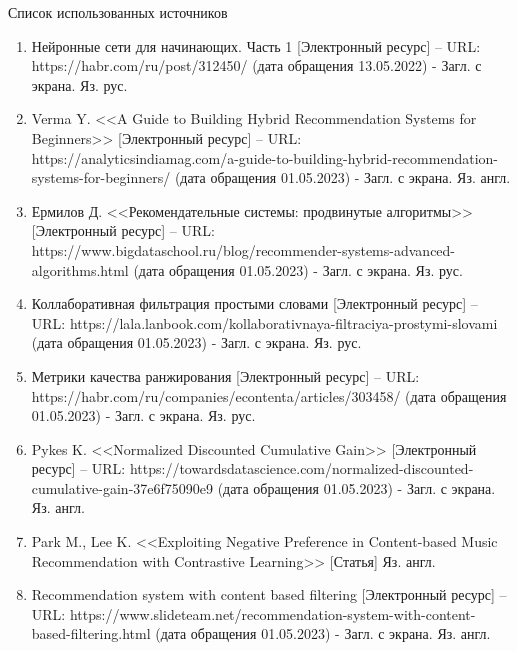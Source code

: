 \documentclass{beamer}
\begin{document}
\begin{frame}{Список использованных источников}
  \begin{enumerate}
    \item Нейронные сети для начинающих. Часть 1 [Электронный ресурс] – URL: https://habr.com/ru/post/312450/ (дата обращения 13.05.2022) - Загл. с экрана. Яз. рус.
    \item Verma Y. <<A Guide to Building Hybrid Recommendation Systems for Beginners>> [Электронный ресурс] – URL: https://analyticsindiamag.com/a-guide-to-building-hybrid-recommendation-systems-for-beginners/ (дата обращения 01.05.2023) - Загл. с экрана. Яз. англ.
    \item Ермилов Д. <<Рекомендательные системы: продвинутые алгоритмы>> [Электронный ресурс] – URL: https://www.bigdataschool.ru/blog/recommender-systems-advanced-algorithms.html (дата обращения 01.05.2023) - Загл. с экрана. Яз. рус.
  \end{enumerate} 
\end{frame}

\begin{frame}
  \begin{enumerate}
    \setcounter{enumi}{3}
    \item Коллаборативная фильтрация простыми словами [Электронный ресурс] – URL: https://lala.lanbook.com/kollaborativnaya-filtraciya-prostymi-slovami (дата обращения 01.05.2023) - Загл. с экрана. Яз. рус.
    \item Метрики качества ранжирования [Электронный ресурс] – URL: https://habr.com/ru/companies/econtenta/articles/303458/ (дата обращения 01.05.2023) - Загл. с экрана. Яз. рус.
    \item Pykes K. <<Normalized Discounted Cumulative Gain>> [Электронный ресурс] – URL: https://towardsdatascience.com/normalized-discounted-cumulative-gain-37e6f75090e9 (дата обращения 01.05.2023) - Загл. с экрана. Яз. англ.
    \item Park M., Lee K. <<Exploiting Negative Preference in Content-based Music Recommendation with Contrastive Learning>> [Статья] Яз. англ.
    \item Recommendation system with content based filtering [Электронный ресурс] – URL: https://www.slideteam.net/recommendation-system-with-content-based-filtering.html (дата обращения 01.05.2023) - Загл. с экрана. Яз. англ.
  \end{enumerate}
\end{frame}
\end{document}
